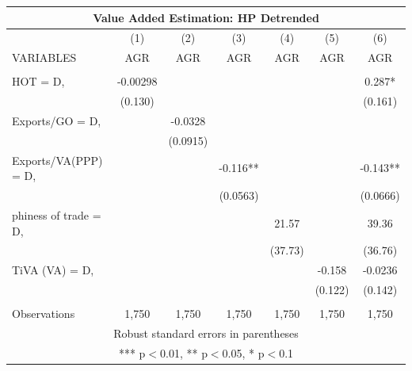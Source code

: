 \documentclass[]{article}
\begin{document}
\begin{tabular}{lcccccc}
\multicolumn{7}{c}{Value Added Estimation: HP Detrended} \\ \hline
 & (1) & (2) & (3) & (4) & (5) & (6) \\
VARIABLES & AGR & AGR & AGR & AGR & AGR & AGR \\ \hline
 &  &  &  &  &  &  \\
HOT = D, & -0.00298 &  &  &  &  & 0.287* \\
 & (0.130) &  &  &  &  & (0.161) \\
Exports/GO = D, &  & -0.0328 &  &  &  &  \\
 &  & (0.0915) &  &  &  &  \\
Exports/VA(PPP) = D, &  &  & -0.116** &  &  & -0.143** \\
 &  &  & (0.0563) &  &  & (0.0666) \\
phiness of trade = D, &  &  &  & 21.57 &  & 39.36 \\
 &  &  &  & (37.73) &  & (36.76) \\
TiVA (VA) = D, &  &  &  &  & -0.158 & -0.0236 \\
 &  &  &  &  & (0.122) & (0.142) \\
 &  &  &  &  &  &  \\
 Observations & 1,750 & 1,750 & 1,750 & 1,750 & 1,750 & 1,750 \\ \hline
\multicolumn{7}{c}{ Robust standard errors in parentheses} \\
\multicolumn{7}{c}{ *** p$<$0.01, ** p$<$0.05, * p$<$0.1} \\
\end{tabular}
\end{document}
